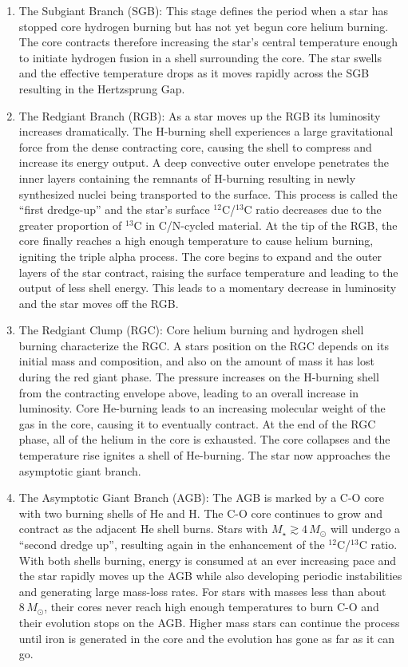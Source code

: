 \begin{enumerate}
%
\item The Subgiant Branch (SGB): This stage defines the period when a star has stopped core hydrogen burning but has not yet begun core helium burning. The core contracts therefore increasing the star's central temperature enough to initiate hydrogen fusion in a shell surrounding the core. The star swells and the effective temperature drops as it moves rapidly across the SGB resulting in the Hertzsprung Gap.
%
\item The Redgiant Branch (RGB): As a star moves up the RGB its luminosity increases dramatically. The H-burning shell experiences a large gravitational force from the dense contracting core, causing the shell to compress and increase its energy output. A deep convective outer envelope penetrates the inner layers containing the remnants of H-burning resulting in newly synthesized nuclei being transported to the surface. This process is called the ``first dredge-up'' and the star's surface $^{12}$C/$^{13}$C ratio decreases due to the greater proportion of $^{13}$C in C/N-cycled material. At the tip of the RGB, the core finally reaches a high enough temperature to cause helium burning, igniting the triple alpha process. The core begins to expand and the outer layers of the star contract, raising the surface temperature and leading to the output of less shell energy. This leads to a momentary decrease in luminosity and the star moves off the RGB.
%
\item The Redgiant Clump (RGC): Core helium burning and hydrogen shell burning characterize the RGC. A stars position on the RGC depends on its initial mass and composition, and  also on the amount of mass it has lost during the red giant phase. The pressure increases on the H-burning shell from the contracting envelope above, leading to an overall increase in luminosity. Core He-burning leads to an increasing molecular weight of the gas in the core, causing it to eventually contract. At the end of the RGC phase, all of the helium in the core is exhausted. The core collapses and the temperature rise ignites a shell of He-burning. The star now approaches the asymptotic giant branch.
%
\item The Asymptotic Giant Branch (AGB): The AGB is marked by a C-O core with two burning shells of He and H. The C-O core continues to grow and contract as the adjacent He shell burns. Stars with $M_{\star} \gtrsim 4\,M_{\odot}$ will undergo a ``second dredge up'', resulting again in the enhancement of the $^{12}$C/$^{13}$C ratio. With both shells burning, energy is consumed at an ever increasing pace and the star rapidly moves up the AGB while also developing periodic instabilities and generating large mass-loss rates. For stars with masses less than about $8\,M_{\odot}$, their cores never reach high enough temperatures to burn C-O and their evolution stops on the AGB. Higher mass stars can continue the process until iron is generated in the core and the evolution has gone as far as it can go.
\end{enumerate}

